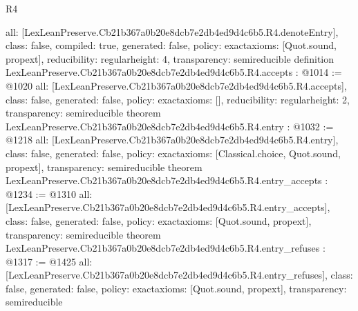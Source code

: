 \begin{lexlean}{R4}
\begin{coremodule}
{  all: [LexLeanPreserve.Cb21b367a0b20e8dcb7e2db4ed9d4c6b5.R4.denoteEntry],
  class: false,
  compiled: true,
  generated: false,
  policy: exact{axioms: [Quot.sound, propext]},
  reducibility: regular{height: 4},
  transparency: semireducible
}
definition LexLeanPreserve.Cb21b367a0b20e8dcb7e2db4ed9d4c6b5.R4.accepts : @1014 := @1020 {
  all: [LexLeanPreserve.Cb21b367a0b20e8dcb7e2db4ed9d4c6b5.R4.accepts],
  class: false,
  generated: false,
  policy: exact{axioms: []},
  reducibility: regular{height: 2},
  transparency: semireducible
}
theorem LexLeanPreserve.Cb21b367a0b20e8dcb7e2db4ed9d4c6b5.R4.entry : @1032 := @1218 {
  all: [LexLeanPreserve.Cb21b367a0b20e8dcb7e2db4ed9d4c6b5.R4.entry],
  class: false,
  generated: false,
  policy: exact{axioms: [Classical.choice, Quot.sound, propext]},
  transparency: semireducible
}
theorem LexLeanPreserve.Cb21b367a0b20e8dcb7e2db4ed9d4c6b5.R4.entry_accepts : @1234 := @1310 {
  all: [LexLeanPreserve.Cb21b367a0b20e8dcb7e2db4ed9d4c6b5.R4.entry_accepts],
  class: false,
  generated: false,
  policy: exact{axioms: [Quot.sound, propext]},
  transparency: semireducible
}
theorem LexLeanPreserve.Cb21b367a0b20e8dcb7e2db4ed9d4c6b5.R4.entry_refuses : @1317 := @1425 {
  all: [LexLeanPreserve.Cb21b367a0b20e8dcb7e2db4ed9d4c6b5.R4.entry_refuses],
  class: false,
  generated: false,
  policy: exact{axioms: [Quot.sound, propext]},
  transparency: semireducible
}


\end{coremodule}
\end{lexlean}
